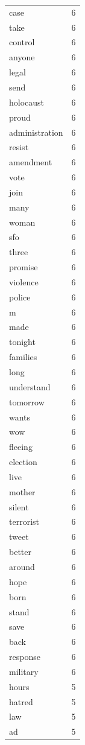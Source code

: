 \begin{tabular}{lr}
case & 6 \\
take & 6 \\
control & 6 \\
anyone & 6 \\
legal & 6 \\
send & 6 \\
holocaust & 6 \\
proud & 6 \\
administration & 6 \\
resist & 6 \\
amendment & 6 \\
vote & 6 \\
join & 6 \\
many & 6 \\
woman & 6 \\
sfo & 6 \\
three & 6 \\
promise & 6 \\
violence & 6 \\
police & 6 \\
m & 6 \\
made & 6 \\
tonight & 6 \\
families & 6 \\
long & 6 \\
understand & 6 \\
tomorrow & 6 \\
wants & 6 \\
wow & 6 \\
fleeing & 6 \\
election & 6 \\
live & 6 \\
mother & 6 \\
silent & 6 \\
terrorist & 6 \\
tweet & 6 \\
better & 6 \\
around & 6 \\
hope & 6 \\
born & 6 \\
stand & 6 \\
save & 6 \\
back & 6 \\
response & 6 \\
military & 6 \\
hours & 5 \\
hatred & 5 \\
law & 5 \\
ad & 5 \\

\end{tabular}
